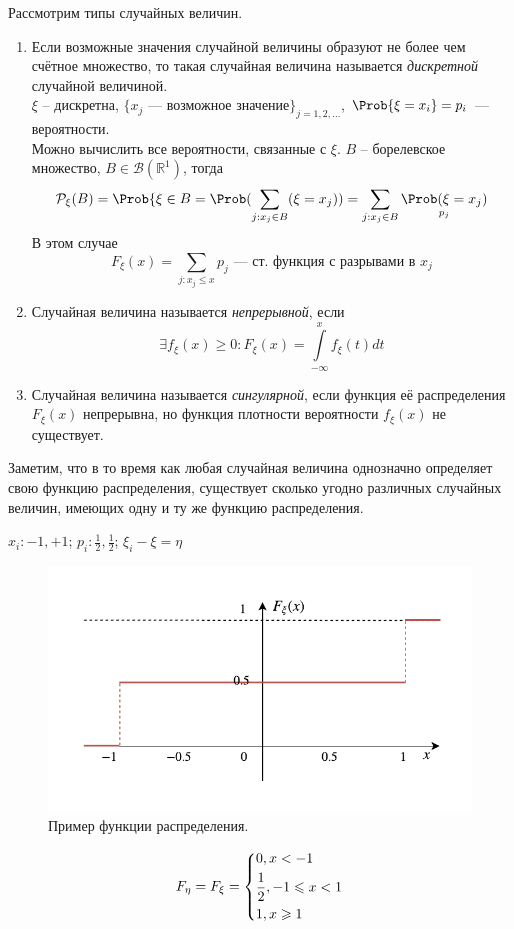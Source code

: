 Рассмотрим типы случайных величин.
\begin{enumerate}
	\item Если возможные значения случайной величины образуют не более чем счётное множество, то такая случайная величина называется \textit{дискретной} случайной величиной. \\
	$\xi$ -- дискретна, $\{x_j \text{ --- возможное значение} \}_{j = 1, 2, \ldots}$, $\Prob \{ \xi = x_i \} = p_i$ --- вероятности. \\
	Можно вычислить все вероятности, связанные с $\xi$. $B$ -- борелевское множество, $B \in \mathcal{B} (\mathbb{R}^1)$, тогда
	\[
		\mathcal{P}_\xi (B) = \Prob \{ \xi \in B = \Prob (\sum\limits_{j : x_j \in B} (\xi = x_j)) = \sum\limits_{j : x_j \in B} \underset{p_j}{\Prob (\xi = x_j)}
	\]
	В этом случае
	\[
		F_\xi (x) = \sum\limits_{j : x_j \leqslant x} p_j \text{ --- ст. функция с разрывами в $x_j$}
	\]
	\item Случайная величина называется \textit{непрерывной}, если
	\[
		\exists f_\xi (x) \geqslant 0 : F_\xi (x) = \int\limits_{-\infty}^x f_\xi (t) dt
	\]
	\item Случайная величина называется \textit{сингулярной}, если функция её распределения $F_\xi (x)$ непрерывна, но функция плотности вероятности $f_\xi (x)$ не существует.
\end{enumerate}
Заметим, что в то время как любая случайная величина однозначно определяет свою функцию распределения, существует сколько угодно различных случайных величин, имеющих одну и ту же функцию распределения.
\begin{example} $x_i: -1, +1$; $p_i: \frac{1}{2}, \frac{1}{2}$; $\xi_i - \xi = \eta$

\begin{figure}[H]
	\begin{center}
	\includegraphics[width=\textwidth,height=\textheight,keepaspectratio]{Images/plot2-4.pdf}
	\end{center}
	\caption{Пример функции распределения.}
\end{figure}

	\[
		F_\eta = F_\xi =
		\begin{dcases*}
			0, x < -1 \\
			\frac{1}{2}, -1 \leqslant x < 1 \\
			1, x \geqslant 1
		\end{dcases*}
	\]
\end{example}
